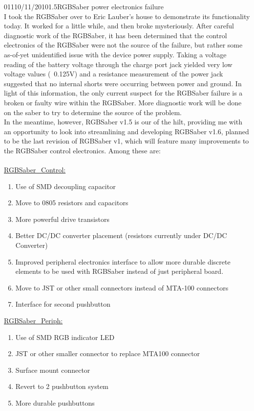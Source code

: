 \documentclass[12pt,letterpaper,onecolumn]{article}
\begin{document}
\begin{nbentry}{011}{10/11/2010}{1.5}{RGBSaber power electronics failure}
\\	I took the RGBSaber over to Eric Lauber's house to demonstrate its functionality today. It worked for a little while, and then broke mysteriously. After careful diagnostic work of the RGBSaber, it has been determined that the control electronics of the RGBSaber were not the source of the failure, but rather some as-of-yet unidentified issue with the device power supply. Taking a voltage reading of the battery voltage through the charge port jack yielded very low voltage values (~0.125V) and a resistance measurement of the power jack suggested that no internal shorts were occurring between power and ground. In light of this information, the only current suspect for the RGBSaber failure is a broken or faulty wire within the RGBSaber. More diagnostic work will be done on the saber to try to determine the source of the problem. \\
	In the meantime, however, RGBSaber v1.5 is our of the hilt, providing me with an opportunity to look into streamlining and developing RGBSaber v1.6, planned to be the last revision of RGBSaber v1, which will feature many improvements to the RGBSaber control electronics. Among these are: \\ \\
\underline{RGBSaber\_Control:}
\begin{enumerate}
\item Use of SMD decoupling capacitor
\item Move to 0805 resistors and capacitors
\item More powerful drive transistors
\item Better DC/DC converter placement (resistors currently under DC/DC Converter)
\item Improved peripheral electronics interface to allow more durable discrete elements to be used with RGBSaber instead of just peripheral board.
\item Move to JST or other small connectors instead of MTA-100 connectors
\item Interface for second pushbutton
\end{enumerate}

\underline{RGBSaber\_Periph:}
\begin{enumerate}
\item Use of SMD RGB indicator LED
\item JST or other smaller connector to replace MTA100 connector
\item Surface mount connector
\item Revert to 2 pushbutton system
\item More durable pushbuttons
\end{enumerate}
\end{nbentry}
\end{document}
